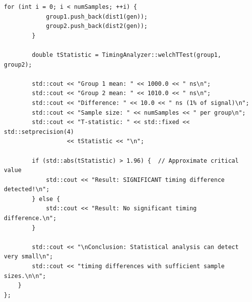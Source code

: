 \documentclass[12pt,a4paper]{article}
\theoremstyle{definition}
\begin{document}
\begin{lstlisting}[style=cryptoCode, caption={Timing Attack Simulation Framework}]
        for (int i = 0; i < numSamples; ++i) {
            group1.push_back(dist1(gen));
            group2.push_back(dist2(gen));
        }
        
        double tStatistic = TimingAnalyzer::welchTTest(group1, group2);
        
        std::cout << "Group 1 mean: " << 1000.0 << " ns\n";
        std::cout << "Group 2 mean: " << 1010.0 << " ns\n";
        std::cout << "Difference: " << 10.0 << " ns (1% of signal)\n";
        std::cout << "Sample size: " << numSamples << " per group\n";
        std::cout << "T-statistic: " << std::fixed << std::setprecision(4) 
                  << tStatistic << "\n";
        
        if (std::abs(tStatistic) > 1.96) {  // Approximate critical value
            std::cout << "Result: SIGNIFICANT timing difference detected!\n";
        } else {
            std::cout << "Result: No significant timing difference.\n";
        }
        
        std::cout << "\nConclusion: Statistical analysis can detect very small\n";
        std::cout << "timing differences with sufficient sample sizes.\n\n";
    }
};
\end{lstlisting}
\end{document}
